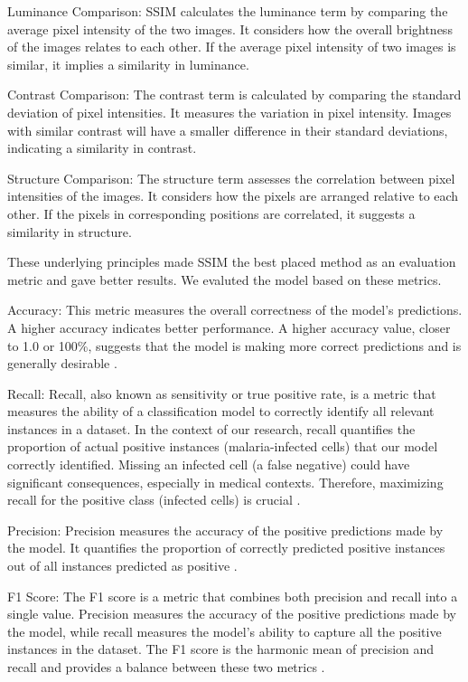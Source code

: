 \documentclass[journal,11pt,onecolumn,draftcls]{IEEEtran}
\begin{document}
Luminance Comparison: SSIM calculates the luminance term by comparing the average pixel intensity of the two images. It considers how the overall brightness of the images relates to each other. If the average pixel intensity of two images is similar, it implies a similarity in luminance.

Contrast Comparison: The contrast term is calculated by comparing the standard deviation of pixel intensities. It measures the variation in pixel intensity. Images with similar contrast will have a smaller difference in their standard deviations, indicating a similarity in contrast.

Structure Comparison: The structure term assesses the correlation between pixel intensities of the images. It considers how the pixels are arranged relative to each other. If the pixels in corresponding positions are correlated, it suggests a similarity in structure.

These underlying principles made SSIM the best placed method as an evaluation metric and gave better results. We evaluted the model based on these metrics.

Accuracy: This metric measures the overall correctness of the model's predictions. A higher accuracy indicates better performance. A higher accuracy value, closer to 1.0 or 100\%, suggests that the model is making more correct predictions and is generally desirable \cite{powers2011}.

Recall: Recall, also known as sensitivity or true positive rate, is a metric that measures the ability of a classification model to correctly identify all relevant instances in a dataset. In the context of our research, recall quantifies the proportion of actual positive instances (malaria-infected cells) that our model correctly identified. Missing an infected cell (a false negative) could have significant consequences, especially in medical contexts. Therefore, maximizing recall for the positive class (infected cells) is crucial \cite{powers2011}.

Precision: Precision measures the accuracy of the positive predictions made by the model. It quantifies the proportion of correctly predicted positive instances out of all instances predicted as positive \cite{powers2011}.

F1 Score: The F1 score is a metric that combines both precision and recall into a single value. Precision measures the accuracy of the positive predictions made by the model, while recall measures the model's ability to capture all the positive instances in the dataset. The F1 score is the harmonic mean of precision and recall and provides a balance between these two metrics \cite{powers2011}.
\end{document}
